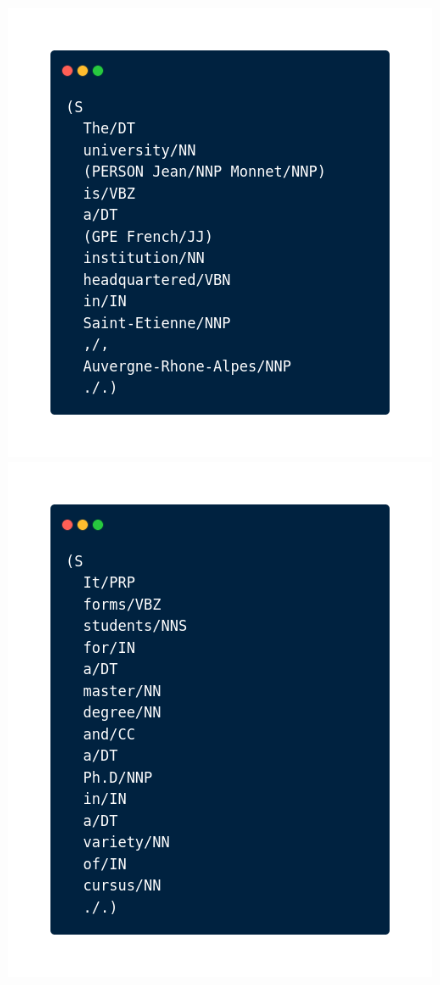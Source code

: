 \begin{frame}{\subsecname}
\begin{figure}[ht]
\includegraphics[scale=.3]{img/ner_output_nltk1.png}
\includegraphics[scale=.3]{img/ner_output_nltk2.png}
\end{figure}
\end{frame}

